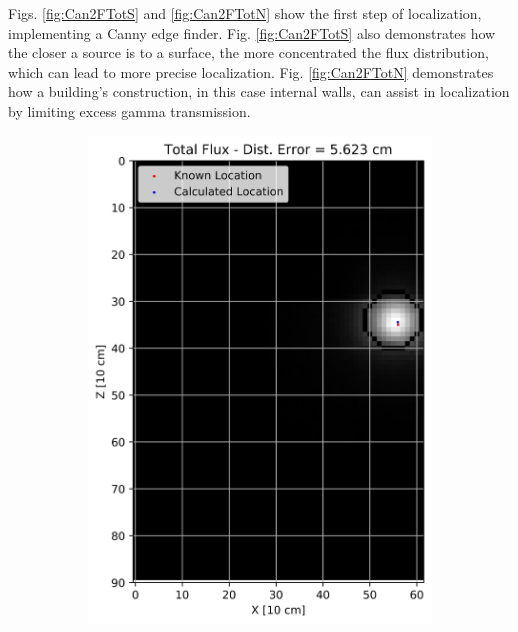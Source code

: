 \noindent Figs. \ref{fig:Can2FTotS} and \ref{fig:Can2FTotN} show the first step of localization, implementing a Canny edge finder. Fig. \ref{fig:Can2FTotS} also demonstrates how the closer a source is to a surface, the more concentrated the flux distribution, which can lead to more precise localization. Fig. \ref{fig:Can2FTotN} demonstrates how a building's construction, in this case internal walls, can assist in localization by limiting excess gamma transmission.

\begin{figure}[!htb]
\begin{subfigure}[b]{0.15\textwidth}
   \centering
   \includegraphics[width=1\linewidth]{images/2Cent_Total_2fl_Wall_S}
   \caption{}
   \label{fig:RanT2W}
\end{subfigure}
\begin{subfigure}[b]{0.15\textwidth}
   \centering

\end{subfigure}
\end{figure}
